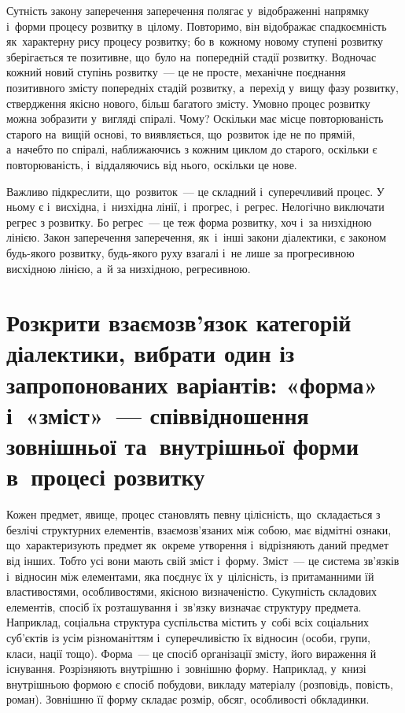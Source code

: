 \documentclass[a5paper,oneside,DIV=12,12pt,headings=small]{scrartcl}
\begin{document}
		Сутність закону заперечення заперечення полягає у~відображенні напрямку і~форми процесу розвитку в~цілому. Повторимо, він відображає спадкоємність як~характерну рису процесу розвитку; бо в~кожному новому ступені розвитку зберігається те позитивне, що~було на~попередній стадії розвитку. Водночас кожний новий ступінь розвитку~— це не просте, механічне поєднання позитивного змісту попередніх стадій розвитку, а~перехід у~вищу фазу розвитку, ствердження якісно нового, більш багатого змісту. Умовно процес розвитку можна зобразити у~вигляді спіралі. Чому? Оскільки має місце повторюваність старого на~вищій основі, то виявляється, що~розвиток іде не по прямій, а~начебто по спіралі, наближаючись з кожним циклом до старого, оскільки є повторюваність, і~віддаляючись від нього, оскільки це нове.
		
		Важливо підкреслити, що~розвиток~— це складний і~суперечливий процес. У ньому є і~висхідна, і~низхідна лінії, і~прогрес, і~регрес. Нелогічно виключати регрес з розвитку. Бо регрес~— це теж форма розвитку, хоч і~за низхідною лінією. Закон заперечення заперечення, як~і~інші закони діалектики, є законом будь-якого розвитку, будь-якого руху взагалі і~не лише за прогресивною висхідною лінією, а~й за низхідною, регресивною.
		
	\section{Розкрити взаємозв'язок категорій діалектики, вибрати один із запропонованих варіантів: «форма» і~«зміст»~— співвідношення зовнішньої та~внутрішньої форми в~процесі розвитку}

		Кожен предмет, явище, процес становлять певну цілісність, що~складається з безлічі структурних елементів, вза\-є\-мо\-зв'я\-за\-них між собою, має відмітні ознаки, що~характеризують предмет як~окреме утворення і~відрізняють даний предмет від інших. Тобто усі вони мають свій зміст і~форму. Зміст~— це система зв'язків і~відносин між елементами, яка поєднує їх у~цілісність, із притаманними їй властивостями, особливостями, якісною визначеністю. Сукупність складових елементів, спосіб їх розташування і~зв'язку визначає структуру предмета. Наприклад, соціальна структура суспільства містить у~собі всіх соціальних суб'єктів із усім різноманіттям і~суперечливістю їх відносин (особи, групи, класи, нації тощо). Форма~— це спосіб організації змісту, його вираження й існування. Розрізняють внутрішню і~зовнішню форму. Наприклад, у~книзі внутрішньою формою є спосіб побудови, викладу матеріалу (розповідь, повість, роман). Зовнішню її форму складає розмір, обсяг, особливості обкладинки.
		
\end{document}
